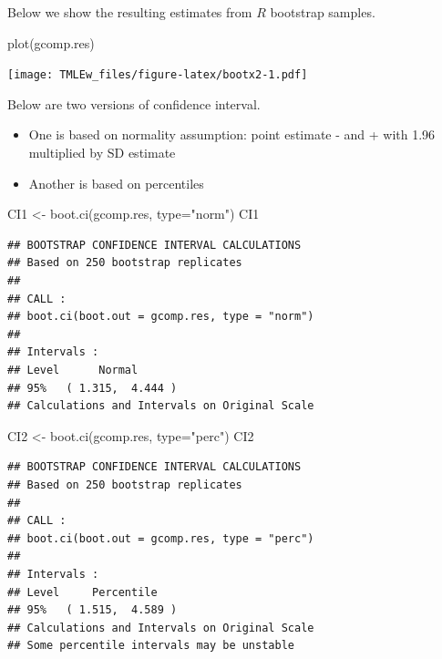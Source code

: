 \documentclass[
]{book}
\newenvironment{Shaded}{\begin{snugshade}}{\end{snugshade}}
\newcommand{\AttributeTok}[1]{\textcolor[rgb]{0.77,0.63,0.00}{#1}}
\newcommand{\FunctionTok}[1]{\textcolor[rgb]{0.00,0.00,0.00}{#1}}
\newcommand{\NormalTok}[1]{#1}
\newcommand{\OtherTok}[1]{\textcolor[rgb]{0.56,0.35,0.01}{#1}}
\newcommand{\StringTok}[1]{\textcolor[rgb]{0.31,0.60,0.02}{#1}}
\providecommand{\tightlist}{%
  \setlength{\itemsep}{0pt}\setlength{\parskip}{0pt}}
\begin{document}
Below we show the resulting estimates from \(R\) bootstrap samples.

\begin{Shaded}
\begin{Highlighting}[]
\FunctionTok{plot}\NormalTok{(gcomp.res) }
\end{Highlighting}
\end{Shaded}

\texttt{[image: TMLEw\_files/figure-latex/bootx2-1.pdf]}

Below are two versions of confidence interval.

\begin{itemize}
\tightlist
\item
  One is based on normality assumption: point estimate - and + with 1.96 multiplied by SD estimate
\item
  Another is based on percentiles
\end{itemize}

\begin{Shaded}
\begin{Highlighting}[]
\NormalTok{CI1 }\OtherTok{\textless{}{-}} \FunctionTok{boot.ci}\NormalTok{(gcomp.res, }\AttributeTok{type=}\StringTok{"norm"}\NormalTok{) }
\NormalTok{CI1}
\end{Highlighting}
\end{Shaded}

\begin{verbatim}
## BOOTSTRAP CONFIDENCE INTERVAL CALCULATIONS
## Based on 250 bootstrap replicates
## 
## CALL : 
## boot.ci(boot.out = gcomp.res, type = "norm")
## 
## Intervals : 
## Level      Normal        
## 95%   ( 1.315,  4.444 )  
## Calculations and Intervals on Original Scale
\end{verbatim}

\begin{Shaded}
\begin{Highlighting}[]
\NormalTok{CI2 }\OtherTok{\textless{}{-}} \FunctionTok{boot.ci}\NormalTok{(gcomp.res, }\AttributeTok{type=}\StringTok{"perc"}\NormalTok{)}
\NormalTok{CI2}
\end{Highlighting}
\end{Shaded}

\begin{verbatim}
## BOOTSTRAP CONFIDENCE INTERVAL CALCULATIONS
## Based on 250 bootstrap replicates
## 
## CALL : 
## boot.ci(boot.out = gcomp.res, type = "perc")
## 
## Intervals : 
## Level     Percentile     
## 95%   ( 1.515,  4.589 )  
## Calculations and Intervals on Original Scale
## Some percentile intervals may be unstable
\end{verbatim}
\end{document}

